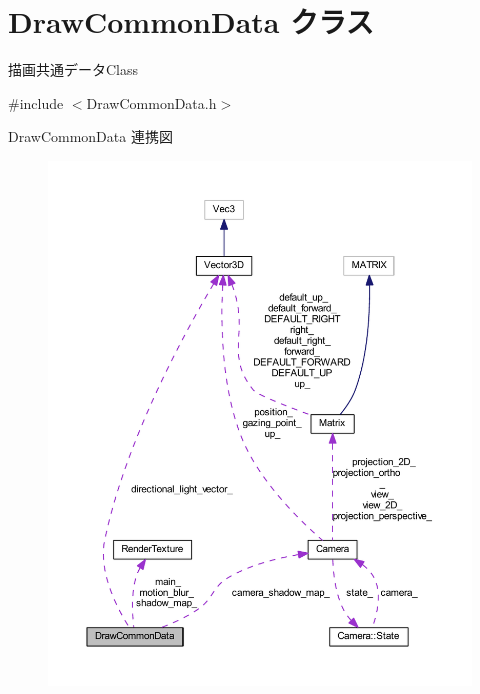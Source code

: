\hypertarget{class_draw_common_data}{}\section{Draw\+Common\+Data クラス}
\label{class_draw_common_data}


描画共通データ\+Class  




{\ttfamily \#include $<$Draw\+Common\+Data.\+h$>$}



Draw\+Common\+Data 連携図\nopagebreak
\begin{figure}[H]
\begin{center}
\leavevmode
\includegraphics[width=350pt]{class_draw_common_data__coll__graph}
\end{center}
\end{figure}
